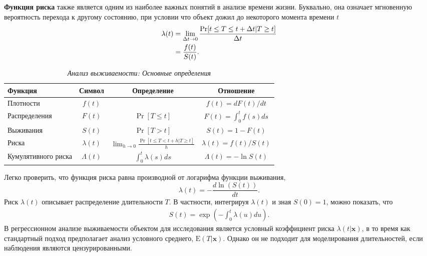 \textbf{Функция риска} %
также является одним из наиболее важных понятий в анализе времени жизни. Буквально, она означает мгновенную вероятность перехода к другому состоянию, при условии что объект дожил до некоторого момента времени $t$
    \begin{align}
    \label{eq:17.4}
    \lambda(t) &= \lim_{\Delta t \rightarrow 0} \frac{\Pr [t \le T \le t+ \Delta t | T \ge t] }{\Delta t}\\
    &= \frac{f(t)}{S(t)}. \notag
    \end{align}

    \begin{table}[!ht]\caption{\textit{Анализ выживаемости: Основные определения}}\label{tab:17.1}
    \begin{center}
\begin{tabular}{lccc}
\hline \hline
Функция             & Символ        & Определение                                                    & Отношение\\
\hline
Плотности           & $f(t)$        &                                                                & $f(t)=dF(t)/dt$\\
Распределения       & $F(t)$        & $\Pr[T \le t]$                                                 & $F(t)=\int_{0}^{t} f(s)ds$ \\
Выживания           & $S(t)$        & $\Pr[T>t]$                                                     & $S(t)=1-F(t)$ \\
Риска               & $\lambda(t)$  & $\lim_{h \rightarrow 0} \frac{\Pr[t \le T < t+h|T \ge t]}{h}$  & $\lambda(t)=f(t)/S(t)$ \\
Кумулятивного риска & $\Lambda(t)$  & $\int_{0}^{t}\lambda(s)ds$                                     & $\Lambda(t)=-\ln S(t)$ \\
\hline \hline
    \end{tabular}
    \end{center}
    \end{table}
Легко проверить, что функция риска равна производной от логарифма функции выживания,
    $$\lambda(t) = - \frac{d \ln(S(t))}{dt}.$$
Риск $\lambda(t)$ описывает распределение длительности $T$. В частности, интегрируя $\lambda(t)$ и зная $S(0)=1$, можно показать, что
    \begin{align}
    \label{eq:17.5}
    S(t) = \exp{ \left( -\int^{t}_{0}\lambda(u)du \right)}.
    \end{align}
В регрессионном анализе выживаемости объектом для исследования является условный коэффициент риска $\lambda(t|\mathbf{x})$, в то время как стандартный подход предполагает анализ условного среднего, $\mathrm{E}(T|\mathbf{x})$. Однако он не подходит для моделирования длительностей, если наблюдения являются цензурированными.

